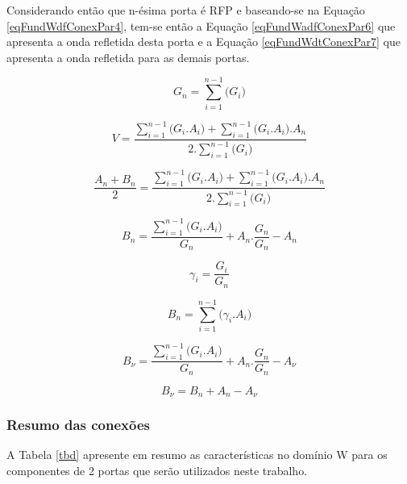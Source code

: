 	Considerando então que n-ésima porta é RFP e baseando-se na Equação \ref{eqFundWdfConexPar4}, tem-se então a Equação \ref{eqFundWadfConexPar6} que apresenta a onda refletida desta porta e a Equação \ref{eqFundWdtConexPar7} que apresenta a onda refletida para as demais portas. 
	
	\begin{equation}
		  G_{n} = \sum_{i=1}^{n-1} \big(G_i\big)
	\end{equation}
	
	\begin{equation}
		V = \frac{\sum_{i=1}^{n-1} \big(G_i.A_i\big) + \sum_{i=1}^{n-1}\big(G_i.A_i\big).A_n}{2.\sum_{i=1}^{n-1} \big(G_i\big)}	
	\end{equation}
	
	\begin{equation}
		\frac{A_n+B_n}{2} = \frac{\sum_{i=1}^{n-1} \big(G_i.A_i\big) + \sum_{i=1}^{n-1}\big(G_i.A_i\big).A_n}{2.\sum_{i=1}^{n-1} \big(G_i\big)}
	\end{equation}
	
	\begin{equation}
		B_n = \frac{\sum_{i=1}^{n-1} \big(G_i.A_i\big)}{G_n}+A_n.\frac{G_n}{G_n} - A_{n}
	\end{equation}
		
	\begin{equation}
		\gamma_i = \frac{G_i}{G_n}
	\end{equation}
	
	\begin{equation}
		\label{eqFundWadfConexPar6}
		B_n = \sum_{i=1}^{n-1} \big(\gamma_i.A_i\big)
	\end{equation}
	
	\begin{equation}
		B_{\nu} = \frac{\sum_{i=1}^{n-1} \big(G_i.A_i\big)}{G_n}+A_n.\frac{G_n}{G_n} - A_{\nu}	
	\end{equation}
	
	\begin{equation}
		\label{eqFundWdtConexPar7}
		B_{\nu} = B_n + A_n - A_{\nu}
	\end{equation}
	
	
		\subsubsection{Resumo das conexões}
	A Tabela \ref{tbd} apresente em resumo as características no domínio W para os componentes de 2 portas que serão utilizados neste trabalho.
	
